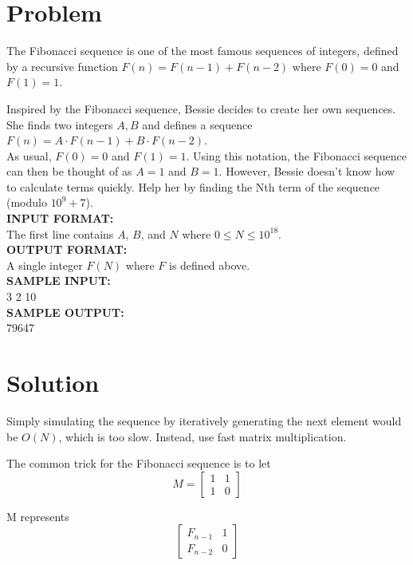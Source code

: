 \documentclass[11pt, oneside]{article}
\begin{document}
\section{Problem}

The Fibonacci sequence is one of the most famous sequences of integers,
defined by a recursive function \( F(n) = F(n - 1) + F(n - 2) \) where
\( F(0) = 0 \) and \( F(1) = 1 \).

\noindent
Inspired by the Fibonacci sequence, Bessie decides to create her own sequences.
She finds two integers \( A, B \) and defines a sequence \( F(n) = A \cdot F(n - 1) + B \cdot F(n - 2) \). \\
As usual, \( F(0) = 0 \) and \( F(1) = 1 \).
Using this notation, the Fibonacci sequence can then be thought of as \( A = 1 \) and \( B = 1 \).
However, Bessie doesn't know how to calculate terms quickly.
Help her by finding the Nth term of the sequence
(modulo \( 10^9 + 7 \)). \\

\noindent
\textbf{INPUT FORMAT:} \\
The first line contains \( A \), \( B \), and \( N \)
where \( 0 \leq N \leq 10^{18} \). \\

\noindent
\textbf{OUTPUT FORMAT:} \\
A single integer \( F(N) \) where \( F \) is defined above. \\

\noindent
\textbf{SAMPLE INPUT:} \\
3 2 10 \\

\noindent
\textbf{SAMPLE OUTPUT:} \\
79647

\newpage

\section{Solution}
Simply simulating the sequence by iteratively generating the next element
would be \( O(N) \), which is too slow. Instead, use fast matrix multiplication.

The common trick for the Fibonacci sequence is to let
\[ M = \begin{bmatrix} 1 & 1 \\ 1 & 0 \end{bmatrix} \]

M represents
\[ \begin{bmatrix} F_{n - 1} & 1 \\ F_{n - 2} & 0 \end{bmatrix} \]
\end{document}
